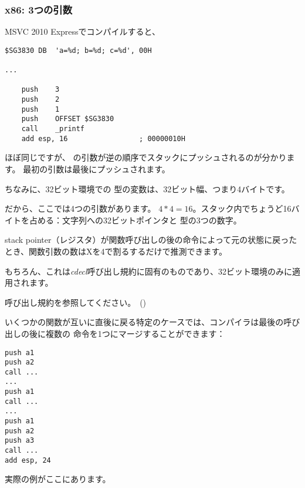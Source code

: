 \subsubsection{x86: 3つの引数}


MSVC 2010 Expressでコンパイルすると、

\begin{lstlisting}[style=customasmx86]
$SG3830	DB	'a=%d; b=%d; c=%d', 00H

...

	push	3
	push	2
	push	1
	push	OFFSET $SG3830
	call	_printf
	add	esp, 16					; 00000010H
\end{lstlisting}

ほぼ同じですが、 \printf の引数が逆の順序でスタックにプッシュされるのが分かります。 最初の引数は最後にプッシュされます。

ちなみに、32ビット環境での \Tint 型の変数は、32ビット幅、つまり4バイトです。

だから、ここでは4つの引数があります。 $4*4 = 16$。スタック内でちょうど16バイトを占める：文字列への32ビットポインタと \Tint 型の3つの数字。

\gls{stack pointer}（\ESP レジスタ）が関数呼び出しの後の命令によって元の状態に戻ったとき、関数引数の数はXを4で割るするだけで推測できます。

もちろん、これは\emph{cdecl}呼び出し規約に固有のものであり、32ビット環境のみに適用されます。 

呼び出し規約を参照してください。~()

いくつかの関数が互いに直後に戻る特定のケースでは、コンパイラは最後の呼び出しの後に複数の 命令を1つにマージすることができます：

\begin{lstlisting}[style=customasmx86]
push a1
push a2
call ...
...
push a1
call ...
...
push a1
push a2
push a3
call ...
add esp, 24
\end{lstlisting}

実際の例がここにあります。



